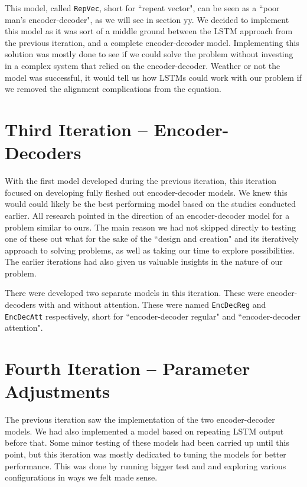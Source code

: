 This model, called {\tt RepVec}, short for ``repeat vector", can be seen as a ``poor man's encoder-decoder", as we will see in section yy. We decided to implement this model as it was sort of a middle ground between the LSTM approach from the previous iteration, and a complete encoder-decoder model. Implementing this solution was mostly done to see if we could solve the problem without investing in a complex system that relied on the encoder-decoder. Weather or not the model was successful, it would tell us how LSTMs could work with our problem if we removed the alignment complications from the equation.


\section{Third Iteration -- Encoder-Decoders}
With the first model developed during the previous iteration, this iteration focused on developing fully fleshed out encoder-decoder models. We knew this would could likely be the best performing model based on the studies conducted earlier. All research pointed in the direction of an encoder-decoder model for a problem similar to ours. The main reason we had not skipped directly to testing one of these out what for the sake of the ``design and creation" and its iteratively approach to solving problems, as well as taking our time to explore possibilities. The earlier iterations had also given us valuable insights in the nature of our problem.

There were developed two separate models in this iteration. These were encoder-decoders with and without attention. These were named {\tt EncDecReg} and {\tt EncDecAtt} respectively, short for ``encoder-decoder regular" and ``encoder-decoder attention".


\section{Fourth Iteration -- Parameter Adjustments}
The previous iteration saw the implementation of the two encoder-decoder models. We had also implemented a model based on repeating LSTM output before that. Some minor testing of these models had been carried up until this point, but this iteration was mostly dedicated to tuning the models for better performance. This was done by running bigger test and and exploring various configurations in ways we felt made sense. 

